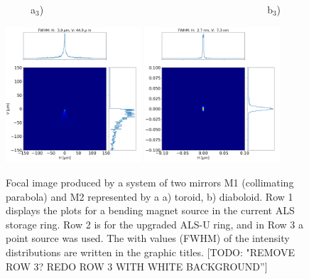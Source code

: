 \documentclass{iucr}              %
\newcommand{\todo}[1]{{\color{red}[TODO: "#1'']}}
\begin{document}
\begin{figure}
\flushleft
~~~~~a$_3$)~~~~~~~~~~~~~~~~~~~~~~~~~~~~~~~~~~~~~~~~~~~~~b$_3$) \\
\centering

\includegraphics[width=0.45\textwidth]{figures/bl_point_toroid.png} 
\includegraphics[width=0.45\textwidth]{figures/bl_point_diaboloid-exact.png}  \\
\caption{Focal image produced by a system of two mirrors M1 (collimating parabola) and M2 represented by a a) toroid, b) diaboloid. Row 1 displays the plots for a bending magnet source in the current ALS storage ring. Row 2 is for the upgraded ALS-U ring, and in Row 3 a point source was used. The with values (FWHM) of the intensity distributions are written in the graphic titles. \todo{REMOVE ROW 3? REDO ROW 3 WITH WHITE BACKGROUND}
}
\end{figure}
\end{document}
